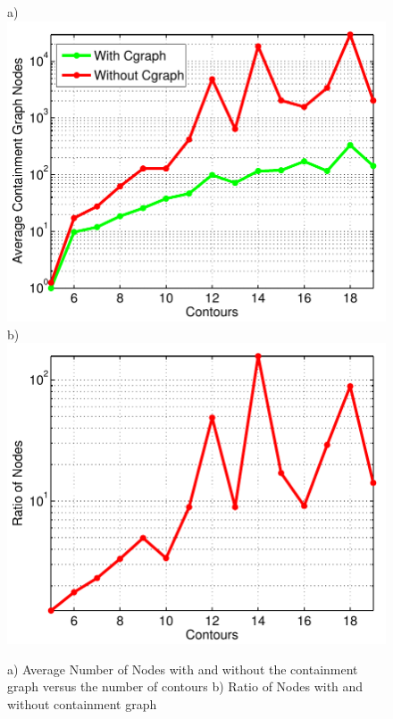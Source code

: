 \begin{figure}[h]
\centering
  a) \includegraphics[width=0.43\linewidth]{figs/08_01_12_value_containment_graph.pdf}
  b)\includegraphics[width=0.43\linewidth]{figs/08_01_12_ratio.pdf}
  \caption{a) Average Number of Nodes with and without the containment graph versus the number of contours b) Ratio of Nodes with and without containment graph}
  \label{fig:graph_with_without}
\end{figure}




 





